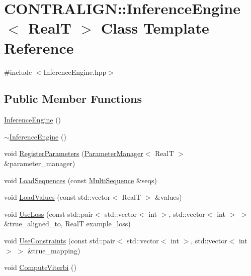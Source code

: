 \hypertarget{class_c_o_n_t_r_a_l_i_g_n_1_1_inference_engine}{\section{C\+O\+N\+T\+R\+A\+L\+I\+G\+N\+:\+:Inference\+Engine$<$ Real\+T $>$ Class Template Reference}
\label{class_c_o_n_t_r_a_l_i_g_n_1_1_inference_engine}
}


{\ttfamily \#include $<$Inference\+Engine.\+hpp$>$}

\subsection*{Public Member Functions}
\begin{DoxyCompactItemize}
\item 
\hyperlink{class_c_o_n_t_r_a_l_i_g_n_1_1_inference_engine_a7af56db0c13459abd1969df84124f321}{Inference\+Engine} ()
\item 
\hyperlink{class_c_o_n_t_r_a_l_i_g_n_1_1_inference_engine_ab79efe41385aeef2e1703dc9335a4941}{$\sim$\+Inference\+Engine} ()
\item 
void \hyperlink{class_c_o_n_t_r_a_l_i_g_n_1_1_inference_engine_a5f4b92138aaa9a45fcc045f818286bd8}{Register\+Parameters} (\hyperlink{class_c_o_n_t_r_a_l_i_g_n_1_1_parameter_manager}{Parameter\+Manager}$<$ Real\+T $>$ \&parameter\+\_\+manager)
\item 
void \hyperlink{class_c_o_n_t_r_a_l_i_g_n_1_1_inference_engine_aa40d344db1b7b342ae3767888bfdd515}{Load\+Sequences} (const \hyperlink{class_c_o_n_t_r_a_l_i_g_n_1_1_multi_sequence}{Multi\+Sequence} \&seqs)
\item 
void \hyperlink{class_c_o_n_t_r_a_l_i_g_n_1_1_inference_engine_abd2764fab807200098b69141b0d1eaca}{Load\+Values} (const std\+::vector$<$ Real\+T $>$ \&values)
\item 
void \hyperlink{class_c_o_n_t_r_a_l_i_g_n_1_1_inference_engine_a84cfccdea4867f0eaccfcbbc50abbb60}{Use\+Loss} (const std\+::pair$<$ std\+::vector$<$ int $>$, std\+::vector$<$ int $>$ $>$ \&true\+\_\+aligned\+\_\+to, Real\+T example\+\_\+loss)
\item 
void \hyperlink{class_c_o_n_t_r_a_l_i_g_n_1_1_inference_engine_a570f4d58edc8d5470798dd0a4c94b829}{Use\+Constraints} (const std\+::pair$<$ std\+::vector$<$ int $>$, std\+::vector$<$ int $>$ $>$ \&true\+\_\+mapping)
\item 
void \hyperlink{class_c_o_n_t_r_a_l_i_g_n_1_1_inference_engine_ad31521433bc7ca8747f42313571dca0d}{Compute\+Viterbi} ()

\end{DoxyCompactItemize}
